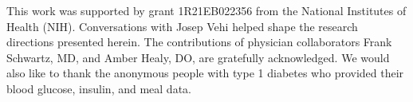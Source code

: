 \documentclass[graybox]{svmult}
\begin{document}
\begin{acknowledgement}
This work was supported by grant 1R21EB022356 from the National Institutes of Health (NIH).  Conversations with Josep Vehi helped shape the research directions presented herein.  The contributions of physician collaborators Frank Schwartz, MD, and Amber Healy, DO, are gratefully acknowledged.  We would also like to thank the anonymous people with type 1 diabetes who provided their blood glucose, insulin, and meal data.
\end{acknowledgement}




\end{document}
